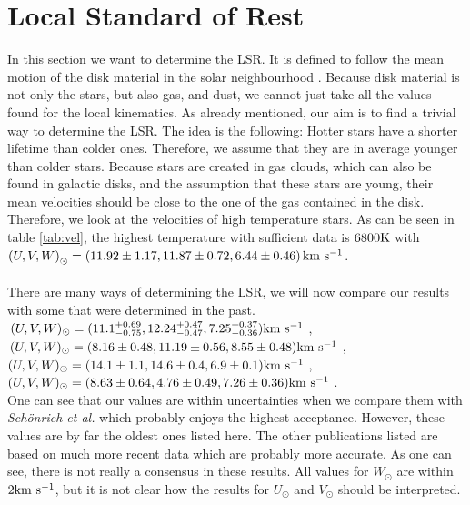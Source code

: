 \documentclass{aastex62}
\begin{document}
	\section{Local Standard of Rest} \label{lsr}
	\noindent
	In this section we want to determine the LSR. It is defined to follow the mean motion of the disk material in the solar neighbourhood \citep{shu}. Because disk material is not only the stars, but also gas, and dust, we cannot just take all the values found for the local kinematics. As already mentioned, our aim is to find a trivial way to determine the LSR. The idea is the following: Hotter stars have a shorter lifetime than colder ones. Therefore, we assume that they are in average younger than colder stars. Because stars are created in gas clouds, which can also be found in galactic disks, and the assumption that these stars are young, their mean velocities should be close to the one of the gas contained in the disk. Therefore, we look at the velocities of high temperature stars. As can be seen in table \ref{tab:vel}, the highest temperature with sufficient data is $6800\rm K$ with $\left( U, V, W\right)_\odot=\left( 11.92\pm1.17, 11.87\pm0.72, 6.44\pm0.46 \right)\rm km~s^{-1}$.
	\\
	\\
	There are many ways of determining the LSR, we will now compare our results with some that were determined in the past.
	\\
	$\,(U,V,W)_\odot=(11.1^{+0.69}_{-0.75}, 12.24^{+0.47}_{-0.47}, 7.25^{+0.37}_{-0.36})\rm km~s^{-1}$ \citep{schoenrich},
	\\
	$\,(U,V,W)_\odot=(8.16\pm0.48, 11.19\pm0.56, 8.55\pm0.48)\rm km~s^{-1}$ \citep{boby},
	\\
	$(U,V,W)_\odot=(14.1\pm1.1, 14.6\pm0.4, 6.9\pm0.1)\rm km~s^{-1}$ 	\citep{anotherlsr},
	\\
	$(U,V,W)_\odot=(8.63\pm0.64, 4.76\pm0.49, 7.26\pm0.36)\rm km~s^{-1}$ \citep{ding}.
	\\
	One can see that our values are within uncertainties when we compare them with \textit{Sch\"onrich et al.} which probably enjoys the highest acceptance. However, these values are by far the oldest ones listed here. The other publications listed are based on much more recent data which are probably more accurate. As one can see, there is not really a consensus in these results. All values for $W_\odot$ are within $2\rm km~s^{-1}$, but it is not clear how the results for $U_\odot$ and $V_\odot$ should be interpreted.
		
\end{document}
